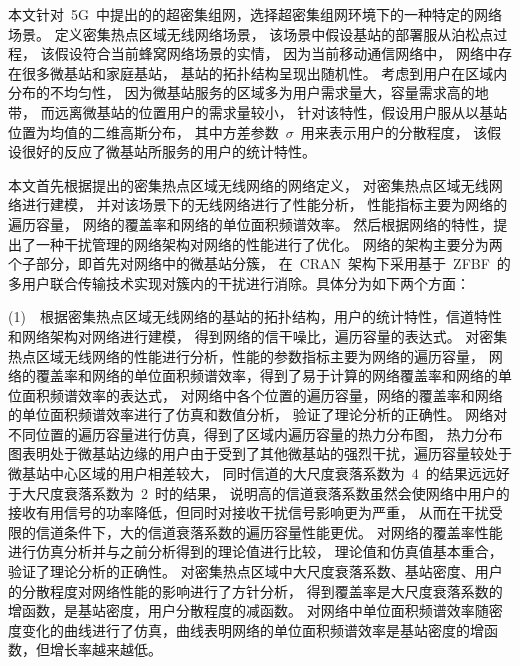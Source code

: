 

本文针对~5G~中提出的的超密集组网，选择超密集组网环境下的一种特定的网络场景。
定义密集热点区域无线网络场景，
该场景中假设基站的部署服从泊松点过程，
该假设符合当前蜂窝网络场景的实情，
因为当前移动通信网络中，
网络中存在很多微基站和家庭基站，
基站的拓扑结构呈现出随机性。
考虑到用户在区域内分布的不均匀性，
因为微基站服务的区域多为用户需求量大，容量需求高的地带，
而远离微基站的位置用户的需求量较小，
针对该特性，假设用户服从以基站位置为均值的二维高斯分布，
其中方差参数~$\sigma$~用来表示用户的分散程度，
该假设很好的反应了微基站所服务的用户的统计特性。

本文首先根据提出的密集热点区域无线网络的网络定义，
对密集热点区域无线网络进行建模，
并对该场景下的无线网络进行了性能分析，
性能指标主要为网络的遍历容量，
网络的覆盖率和网络的单位面积频谱效率。
然后根据网络的特性，提出了一种干扰管理的网络架构对网络的性能进行了优化。
网络的架构主要分为两个子部分，即首先对网络中的微基站分簇，
在~CRAN~架构下采用基于~ZFBF~的多用户联合传输技术实现对簇内的干扰进行消除。具体分为如下两个方面：

(1)~~根据密集热点区域无线网络的基站的拓扑结构，用户的统计特性，信道特性和网络架构对网络进行建模，
得到网络的信干噪比，遍历容量的表达式。
对密集热点区域无线网络的性能进行分析，性能的参数指标主要为网络的遍历容量，
网络的覆盖率和网络的单位面积频谱效率，得到了易于计算的网络覆盖率和网络的单位面积频谱效率的表达式，
对网络中各个位置的遍历容量，网络的覆盖率和网络的单位面积频谱效率进行了仿真和数值分析，
验证了理论分析的正确性。
网络对不同位置的遍历容量进行仿真，得到了区域内遍历容量的热力分布图，
热力分布图表明处于微基站边缘的用户由于受到了其他微基站的强烈干扰，遍历容量较处于微基站中心区域的用户相差较大，
同时信道的大尺度衰落系数为~4~的结果远远好于大尺度衰落系数为~2~时的结果，
说明高的信道衰落系数虽然会使网络中用户的接收有用信号的功率降低，但同时对接收干扰信号影响更为严重，
从而在干扰受限的信道条件下，大的信道衰落系数的遍历容量性能更优。
对网络的覆盖率性能进行仿真分析并与之前分析得到的理论值进行比较，
理论值和仿真值基本重合，验证了理论分析的正确性。
对密集热点区域中大尺度衰落系数、基站密度、用户的分散程度对网络性能的影响进行了方针分析，
得到覆盖率是大尺度衰落系数的增函数，是基站密度，用户分散程度的减函数。
对网络中单位面积频谱效率随密度变化的曲线进行了仿真，曲线表明网络的单位面积频谱效率是基站密度的增函数，但增长率越来越低。

